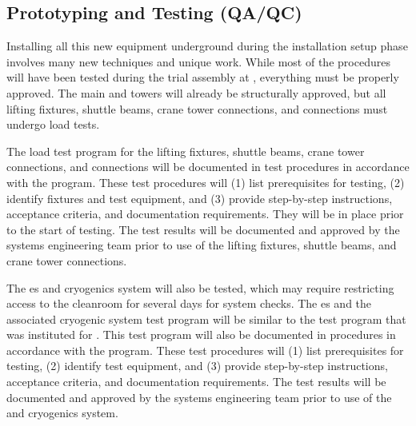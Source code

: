 
\subsection{Prototyping and Testing (QA/QC)}
\label{sec:fdsp-tc-infr-qaqc}


Installing all this new equipment underground during the installation setup phase involves many new techniques  and unique work. While most of the procedures will have been tested during the trial assembly at , everything must be properly approved. The main  and  towers will already be structurally approved, but all lifting fixtures, shuttle beams, crane tower connections, and \coldbox connections must undergo load tests. 


The load test program for the lifting fixtures, shuttle beams, crane tower connections, and \coldbox connections will be documented in test procedures in accordance with the    program.  
These test procedures will (1) list prerequisites for testing, (2) identify fixtures and test equipment, and (3) provide step-by-step instructions, acceptance criteria, and documentation requirements.
They will be in place prior to the start of testing. 
The test results will be documented and approved by the systems engineering team prior to use of the lifting fixtures, shuttle beams, and crane tower connections. %

The \coldbox{}es and cryogenics system will also be tested, which may require restricting  access to the cleanroom  %
for several days for system checks. 
The \coldbox{}es and the associated cryogenic system test program will be similar to the test program that was instituted for . 
This test program will also be documented in procedures in accordance with the    program. 
These test procedures will (1) list prerequisites for testing, (2) identify test equipment, and (3) provide step-by-step instructions, acceptance criteria, and documentation requirements.
 The test results will be documented and approved by the systems engineering team prior to use of the \coldbox and cryogenics system.


